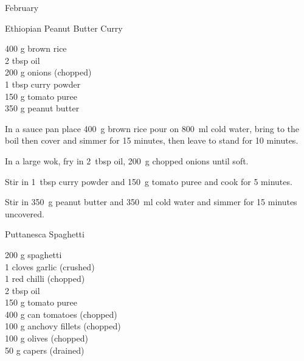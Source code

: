 \begin{menu}{February}
    \begin{recipe}{2}{Ethiopian Peanut Butter Curry}%
		\begin{ingredients}
		400 g brown rice  \\
	2 tbsp oil  \\
	200 g onions (chopped) \\
	1 tbsp curry powder  \\
	150 g tomato puree  \\
	350 g peanut butter  \\
	
		\end{ingredients}
	
    \begin{instructions}
    \item 
      In a
      sauce pan
      place
      400~g  brown rice
      pour on
      800~ml  cold water,
      bring to the boil then cover and simmer for 15 minutes,
      then leave to stand for 10 minutes.
    \item 
        In a large wok,
        fry in 2~tbsp  oil,
        200~g chopped onions
        until soft.
      \item 
        Stir in
        1~tbsp  curry powder
        and
        150~g  tomato puree
        and cook for 5 minutes.
      \item 
        Stir in
        350~g  peanut butter
        and
        350~ml  cold water
        and simmer for 15 minutes uncovered.
      
    \end{instructions}
    \end{recipe}%
  
    \begin{recipe}{1}{Puttanesca Spaghetti}%
		\begin{ingredients}
		200 g spaghetti  \\
	1 cloves garlic (crushed) \\
	1  red chilli (chopped) \\
	2 tbsp oil  \\
	150 g tomato puree  \\
	400 g can tomatoes (chopped) \\
	100 g anchovy fillets (chopped) \\
	100 g olives (chopped) \\
	50 g capers (drained) \\
	
		\end{ingredients}
	

\end{recipe}
\end{menu}
